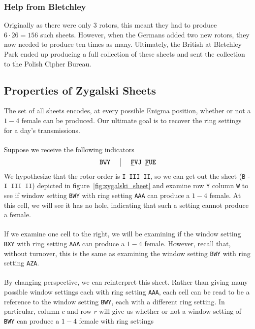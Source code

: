\subsubsection{Help from Bletchley}
Originally as there were only $3$ rotors, this meant they had to
produce $6\cdot 26 = 156$ such sheets. However, when the Germans
added two new rotors, they now needed to produce ten times as many.
Ultimately, the British at Bletchley Park ended up producing a full
collection of these sheets and sent the collection to the Polish Cipher Bureau.

\subsection{Properties of Zygalski Sheets}
The set of all sheets encodes, at every possible Enigma position,
whether or not a $1-4$ female can be produced. Our ultimate goal is
to recover the ring settings for a day's transmissions.
\\\\Suppose we receive the following indicators
\[
  \setlength{\arraycolsep}{15pt}
  \begin{array}{c | c}
    \texttt{BWY} & {\uline{\texttt{F}}}\texttt{VJ
    }{\uline{\texttt{F}}}\texttt{UE}              \\
  \end{array}
\]
We hypothesize that the rotor order is \texttt{I III II}, so we
can get out the sheet (\texttt{B} - \texttt{I III II}) depicted in
figure~\ref{fig:zygalski_sheet} and examine row \texttt{Y} column
\texttt{W} to see if window setting \texttt{BWY} with ring
setting \texttt{AAA} can produce a $1-4$ female. At this cell, we will
see it has no hole, indicating that such a setting cannot produce a female.
\\\\If we examine one cell to the right, we will be examining if the
window setting \texttt{BXY} with ring setting \texttt{AAA} can
produce a $1-4$ female. However, recall that, without turnover, this
is the same as examining the window setting \texttt{BWY} with ring
setting \texttt{AZA}.
\\\\By changing perspective, we can reinterpret this sheet. Rather than
giving many possible window settings each with ring setting
\texttt{AAA}, each cell can be read to be a reference to the window
setting \texttt{BWY}, each with a different ring setting. In
particular, column $c$ and row $r$ will give us whether or not a
window setting of \texttt{BWY} can produce a $1-4$ female with ring settings
